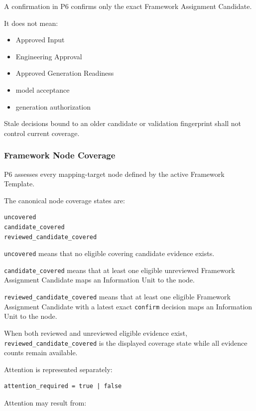 A confirmation in P6 confirms only the exact Framework Assignment Candidate.

It does not mean:

\begin{itemize}
\tightlist
\item
  Approved Input
\item
  Engineering Approval
\item
  Approved Generation Readiness
\item
  model acceptance
\item
  generation authorization
\end{itemize}

Stale decisions bound to an older candidate or validation fingerprint shall not control current coverage.

\hypertarget{framework-node-coverage}{%
\subsubsection{Framework Node Coverage}\label{framework-node-coverage}}

P6 assesses every mapping-target node defined by the active Framework Template.

The canonical node coverage states are:

\begin{verbatim}
uncovered
candidate_covered
reviewed_candidate_covered
\end{verbatim}

\texttt{uncovered} means that no eligible covering candidate evidence exists.

\texttt{candidate\_covered} means that at least one eligible unreviewed Framework Assignment Candidate maps an Information Unit to the node.

\texttt{reviewed\_candidate\_covered} means that at least one eligible Framework Assignment Candidate with a latest exact \texttt{confirm} decision maps an Information Unit to the node.

When both reviewed and unreviewed eligible evidence exist, \texttt{reviewed\_candidate\_covered} is the displayed coverage state while all evidence counts remain available.

Attention is represented separately:

\begin{verbatim}
attention_required = true | false
\end{verbatim}

Attention may result from:

